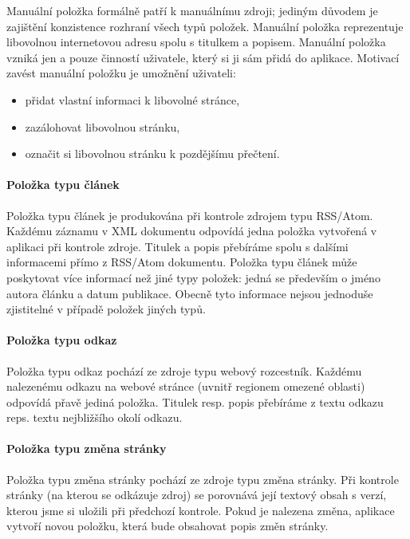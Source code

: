 Manuální položka formálně patří k manuálnímu zdroji; jediným důvodem je zajištění konzistence rozhraní všech typů položek.
Manuální položka reprezentuje libovolnou internetovou adresu spolu s titulkem a popisem.
Manuální položka vzniká jen a pouze činností uživatele, který si ji sám přidá do aplikace.
Motivací zavést manuální položku je umožnění uživateli:
\begin{itemize}
	\item přidat vlastní informaci k libovolné stránce,
	\item zazálohovat libovolnou stránku,
	\item označit si libovolnou stránku k pozdějšímu přečtení.
\end{itemize}

\paragraph{Položka typu článek}

Položka typu článek je produkována při kontrole zdrojem typu RSS/Atom.
Každému záznamu v XML dokumentu odpovídá jedna položka vytvořená v aplikaci při kontrole zdroje.
Titulek a popis přebíráme spolu s dalšími informacemi přímo z RSS/Atom dokumentu.
Položka typu článek může poskytovat více informací než jiné typy položek: jedná se především o jméno autora článku a datum publikace.
Obecně tyto informace nejsou jednoduše zjistitelné v případě položek jiných typů.

\paragraph{Položka typu odkaz}

Položka typu odkaz pochází ze zdroje typu webový rozcestník.
Každému nalezenému odkazu na webové stránce (uvnitř regionem omezené oblasti) odpovídá přavě jediná položka.
Titulek resp. popis přebíráme z textu odkazu reps. textu nejbližšího okolí odkazu.

\paragraph{Položka typu změna stránky}

Položka typu změna stránky pochází ze zdroje typu změna stránky.
Při kontrole stránky (na kterou se odkázuje zdroj) se porovnává její textový obsah s verzí, kterou jsme si uložili při předchozí kontrole.
Pokud je nalezena změna, aplikace vytvoří novou položku, která bude obsahovat popis změn stránky.

